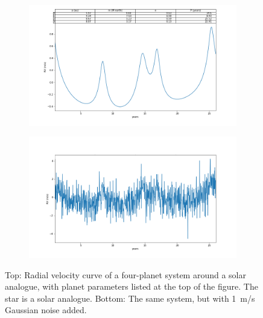 \documentclass[12pt,manuscript]{aastex}
\begin{document}
\begin{figure}
  
  \begin{subfigure}[b]{.9\linewidth}
  \includegraphics[width=\linewidth]{../figures/sample_curve}
  \end{subfigure}
  
  \begin{subfigure}[b]{.9\linewidth}
  \includegraphics[width=\linewidth]{../figures/sample_curve_noisy}
  \end{subfigure}
  
  \caption{Top: Radial velocity curve of a four-planet system around a solar analogue, with planet parameters listed at the top of the figure. The star is a solar analogue. Bottom: The same system, but with \SI{1}{m/s} Gaussian noise added.}
  \label{fig: lightcurve}
\end{figure}
\end{document}
